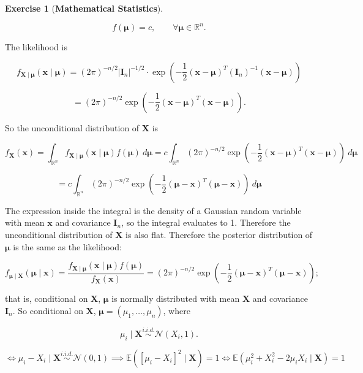\documentclass{article}
\theoremstyle{definition}
\newtheorem{exercise}{Exercise}
\theoremstyle{definition}
\theoremstyle{definition}
\theoremstyle{definition}
\theoremstyle{definition}
\newcommand{\E}{\mathbb{E}}
\begin{document}
\begin{exercise}[\textbf{Mathematical Statistics}]
\begin{enumerate}[(a)]
\[
f(\boldsymbol{\mu}) = c, \qquad \forall \boldsymbol{\mu} \in \mathbb{R}^n.
\]

The likelihood is

\[
f_{\boldsymbol{X} \mid \boldsymbol{\mu}}(\boldsymbol{x} \mid \boldsymbol{\mu}) = (2 \pi)^{-n/2} | \boldsymbol{I}_n|^{-1/2} \cdot \exp \left(- \frac{1}{2}(\boldsymbol{x} - \boldsymbol{\mu}) ^T ( \boldsymbol{I}_n)^{-1} (\boldsymbol{x} - \boldsymbol{\mu} ) \right)
\]

\[
= (2 \pi)^{-n/2} \exp \left(- \frac{1}{2}(\boldsymbol{x} - \boldsymbol{\mu}) ^T  (\boldsymbol{x} - \boldsymbol{\mu} ) \right).
\]

So the unconditional distribution of \(\boldsymbol{X}\) is

\[
f_{\boldsymbol{X}}(\boldsymbol{x})  = \int_{\mathbb{R}^n} f_{\boldsymbol{X} \mid \boldsymbol{\mu}}(\boldsymbol{x} \mid \boldsymbol{\mu}) f(\boldsymbol{\mu}) \ d \boldsymbol{\mu} = c \int_{\mathbb{R}^n}  (2 \pi)^{-n/2} \exp \left(- \frac{1}{2}(\boldsymbol{x} - \boldsymbol{\mu}) ^T  (\boldsymbol{x} - \boldsymbol{\mu} ) \right)  \ d \boldsymbol{\mu}
\]

\[
= c \int_{\mathbb{R}^n}  (2 \pi)^{-n/2} \exp \left(- \frac{1}{2}(  \boldsymbol{\mu} - \boldsymbol{x}) ^T  (\boldsymbol{\mu} - \boldsymbol{x}) \right)  \ d \boldsymbol{\mu}
\]

The expression inside the integral is the density of a Gaussian random variable with mean \(\boldsymbol{x}\) and covariance \(\boldsymbol{I}_n\), so the integral evaluates to 1. Therefore the unconditional distribution of \(\boldsymbol{X}\) is also flat. Therefore the posterior distribution of \(\boldsymbol{\mu}\) is the same as the likelihood:

\[
f_{\boldsymbol{\mu} \mid \boldsymbol{X}}(\boldsymbol{\mu} \mid \boldsymbol{x}) = \frac{f_{\boldsymbol{X} \mid \boldsymbol{\mu}}(\boldsymbol{x} \mid \boldsymbol{\mu}) f(\boldsymbol{\mu})}{f_{\boldsymbol{X}}(\boldsymbol{x})} = (2 \pi)^{-n/2} \exp \left(- \frac{1}{2}(\boldsymbol{\mu} - \boldsymbol{x} ) ^T  ( \boldsymbol{\mu} - \boldsymbol{x}) \right);
\]

that is, conditional on \(\boldsymbol{X}\), \(\boldsymbol{\mu}\) is normally distributed with mean \(\boldsymbol{X}\) and covariance \(\boldsymbol{I}_n\). So  conditional on \(\boldsymbol{X}\), \(\boldsymbol{\mu} = (\mu_1, \ldots, \mu_n)\), where

\[
\mu_i  \mid \boldsymbol{X} \overset{i.i.d.}{\sim} \mathcal{N} \left(  X_i, 1 \right).
\]

\begin{equation}
 \iff  \mu_i -  X_i  \mid \boldsymbol{X} \overset{i.i.d.}{\sim} \mathcal{N} \left(0, 1\right)  \implies  \E \left( \left[ \mu_i -   X_i \right]^2  \mid \boldsymbol{X}  \right) = 1 \iff   \E \left(  \mu_i  ^2  + X_i^2 -  2\mu_i X_i  \mid \boldsymbol{X}  \right) = 1 
\end{equation}


\end{enumerate}
\end{exercise}
\end{document}
